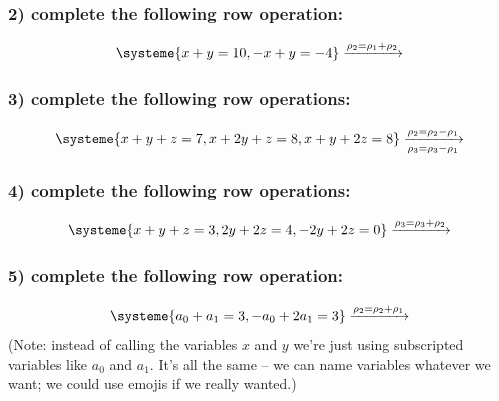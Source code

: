 \documentclass[a4paper,twoside,12pt]{memoir}  %
\begin{document}
\subsubsection{2) complete the following row operation:}
\begin{equation*}
  \systeme{
    x + y = 10,
    -x + y = -4
  }
  \xrightarrow{\rho_2 = \rho_1 + \rho_2}
\end{equation*}

\subsubsection{3) complete the following row operations:}
\begin{equation*}
  \systeme{
    x + y +  z = 7,
    x + 2y + z = 8,
    x + y + 2z = 8
  }
  \xrightarrow[\rho_3 = \rho_3 - \rho_1]{\rho_2 = \rho_2 - \rho_1}
\end{equation*}

\subsubsection{4) complete the following row operations:}
\begin{equation*}
  \systeme{
    x + y +  z = 3,
       2y + 2z = 4,
      -2y + 2z = 0
  }
  \xrightarrow{\rho_3 = \rho_3 + \rho_2}
\end{equation*}

\subsubsection{5) complete the following row operation:}
\begin{equation*}
  \systeme{
    a_0 + a_1 = 3,
   -a_0 + 2a_1 = 3
  }
  \xrightarrow{\rho_2 = \rho_2 + \rho_1}
\end{equation*}
(Note: instead of calling the variables $x$ and $y$ we're just using subscripted variables like $a_0$ and $a_1$. It's all the same -- we can name variables whatever we want; we could use emojis if we really wanted.)
\end{document}
